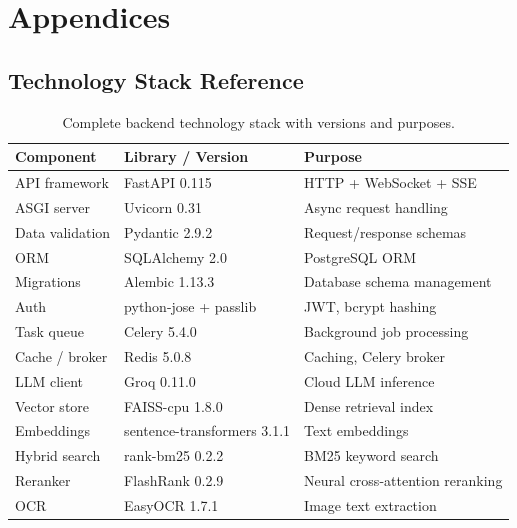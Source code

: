\chapter{Appendices}
\label{chap:appendix}

\section{Technology Stack Reference}
\label{sec:tech-stack}

\begin{table}[ht]
    \centering
    \caption{Complete backend technology stack with versions and purposes.}
    \label{tab:backend-stack}
    \renewcommand{\arraystretch}{1.3}
    \begin{tabular}{lll}
        \toprule
        \textbf{Component} & \textbf{Library / Version} & \textbf{Purpose} \\
        \midrule
        API framework       & FastAPI 0.115         & HTTP + WebSocket + SSE \\
        ASGI server         & Uvicorn 0.31          & Async request handling \\
        Data validation     & Pydantic 2.9.2        & Request/response schemas \\
        ORM                 & SQLAlchemy 2.0        & PostgreSQL ORM \\
        Migrations          & Alembic 1.13.3        & Database schema management \\
        Auth                & python-jose + passlib & JWT, bcrypt hashing \\
        Task queue          & Celery 5.4.0          & Background job processing \\
        Cache / broker      & Redis 5.0.8           & Caching, Celery broker \\
        LLM client          & Groq 0.11.0           & Cloud LLM inference \\
        Vector store        & FAISS-cpu 1.8.0       & Dense retrieval index \\
        Embeddings          & sentence-transformers 3.1.1 & Text embeddings \\
        Hybrid search       & rank-bm25 0.2.2       & BM25 keyword search \\
        Reranker            & FlashRank 0.2.9       & Neural cross-attention reranking \\
        OCR                 & EasyOCR 1.7.1         & Image text extraction \\

\end{tabular}
\end{table}
